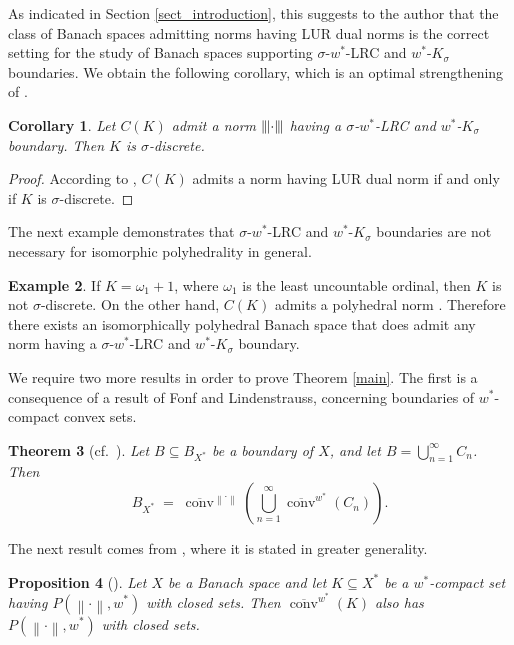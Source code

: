 \documentclass[12pt,reqno]{amsart}
\newcommand{\ball}[1]{\ensuremath{B_{#1}}}
\newcommand{\cl}[1]{\ensuremath{\overline{{#1}}}}
\newcommand{\dual}[1]{\ensuremath{{#1}^*}}
\newcommand{\ndot}{\ensuremath{\left\|\cdot\right\|}}
\newcommand{\tndot}{\ensuremath{\left|\kern-.9pt\left|\kern-.9pt\left|\cdot\right|\kern-.9pt\right|\kern-.9pt\right|}}
\newcommand{\weakstar}{\ensuremath{w^*}}
\newcommand{\wone}{\ensuremath{\omega_1}}
\DeclareMathOperator{\conv}{conv}
\newtheorem{thm}{Theorem}[section]
\newtheorem{cor}[thm]{Corollary}
\newtheorem{prop}[thm]{Proposition}
\theoremstyle{definition}
\newtheorem{example}[thm]{Example}
\begin{document}
As indicated in Section \ref{sect_introduction}, this suggests to the author that the class of Banach spaces admitting norms having LUR dual norms is the correct setting for the study of Banach spaces supporting $\sigma$-$w^*$-LRC and $w^*$-$K_\sigma$ boundaries. We obtain the following corollary, which is an optimal strengthening of \cite[Proposition 20]{fpst:14}.

\begin{cor}\label{sigma-discrete}
Let $C(K)$ admit a norm $\tndot$ having a $\sigma$-$w^*$-LRC and $w^*$-$K_\sigma$ boundary. Then $K$ is $\sigma$-discrete.
\end{cor}

\begin{proof}
According to \cite[Corollary 4.4]{raja:02}, $C(K)$ admits a norm having LUR dual norm if and only if $K$ is $\sigma$-discrete.
\end{proof}

The next example demonstrates that $\sigma$-$w^*$-LRC and $w^*$-$K_\sigma$ boundaries are not necessary for isomorphic polyhedrality in general.

\begin{example}\label{ex_counterexample}
If $K=\wone+1$, where $\wone$ is the least uncountable ordinal, then $K$ is not $\sigma$-discrete. On the other hand, $C(K)$ admits a polyhedral norm \cite[Theorem 1]{fonf:80}. Therefore there exists an isomorphically polyhedral Banach space that does admit any norm having a $\sigma$-$w^*$-LRC and $w^*$-$K_\sigma$ boundary.
\end{example}

We require two more results in order to prove Theorem \ref{main}. The first is a consequence of a result of Fonf and Lindenstrauss, concerning boundaries of $\weakstar$-compact convex sets.

\begin{thm}[{cf.\ \cite[Theorem 2.3]{fl:03}}]\label{fl_thm}
Let $B \subseteq \ball{\dual{X}}$ be a boundary of $X$, and let $B = \bigcup_{n=1}^\infty C_n$. Then
\[
\ball{\dual{X}} \;=\; \cl{\conv}^{\ndot}\left(\bigcup_{n=1}^\infty \cl{\conv}^{\weakstar}(C_n) \right).
\]
\end{thm}

The next result comes from \cite{raja:02}, where it is stated in greater generality.

\begin{prop}[{\cite[Lemma 2.1 and Proposition 2.10]{raja:02}}]\label{prop_raja_P_conv} Let $X$ be a Banach space and let $K \subseteq X^*$ be a $w^*$-compact set having $P(\ndot,w^*)$ with closed sets. Then $\cl{\conv}^{w^*}(K)$ also has $P(\ndot,w^*)$ with closed sets.
\end{prop}
\end{document}
